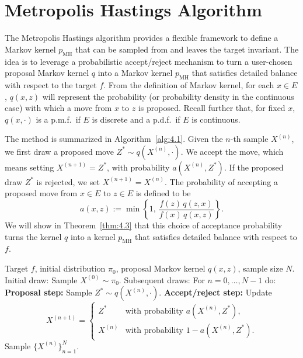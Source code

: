 
\section{Metropolis Hastings Algorithm}
\label{sec:4.1}

The Metropolis Hastings algorithm provides a flexible framework to define a Markov kernel $p_{\mathrm{MH}}$
that can be sampled from and leaves the target invariant. The idea is to leverage a probabilistic
accept/reject mechanism to turn a user-chosen proposal Markov kernel $q$ into a Markov kernel
$p_{\mathrm{MH}}$ that satisfies detailed balance with respect to the target $f$. From the definition of Markov
kernel, for each $x \in E$, $q(x, z)$ will represent the probability (or probability density in the
continuous case) with which a move from $x$ to $z$ is proposed. Recall further that, for fixed $x$,
$q(x, \cdot)$ is a p.m.f.\ if $E$ is discrete and a p.d.f.\ if $E$ is continuous.

The method is summarized in Algorithm~\ref{alg:4.1}. Given the $n$-th sample $X^{(n)}$, we first draw a
proposed move $Z^* \sim q(X^{(n)}, \cdot)$. We accept the move, which means setting $X^{(n+1)} = Z^*$,
with probability $a(X^{(n)}, Z^*)$. If the proposed draw $Z^*$ is rejected, we set $X^{(n+1)} = X^{(n)}$. The
probability of accepting a proposed move from $x \in E$ to $z \in E$ is defined to be
\[
  a(x, z) := \min\!\left\{1,\, \frac{f(z)\, q(z, x)}{f(x)\, q(x, z)}\right\}.
\]
We will show in Theorem~\ref{thm:4.3} that this choice of acceptance probability turns the kernel $q$ into a
kernel $p_{\mathrm{MH}}$ that satisfies detailed balance with respect to $f$.

\begin{algorithm}[H]
\caption{Metropolis Hastings Algorithm}
\label{alg:4.1}
\begin{algorithmic}[1]
\Require Target $f$, initial distribution $\pi_0$, proposal Markov kernel $q(x,z)$, sample size $N$.
\State Initial draw: Sample $X^{(0)} \sim \pi_0$.
\State Subsequent draws: For $n = 0, \ldots, N-1$ do:
\State \textbf{Proposal step:} Sample $Z^* \sim q(X^{(n)}, \cdot)$.
\State \textbf{Accept/reject step:} Update
\[
  X^{(n+1)} =
  \begin{cases}
    Z^*     & \text{with probability } a(X^{(n)}, Z^*),\\
    X^{(n)} & \text{with probability } 1 - a(X^{(n)}, Z^*).
  \end{cases}
\]
\Ensure Sample $\{X^{(n)}\}_{n=1}^{N}$.
\end{algorithmic}
\end{algorithm}

